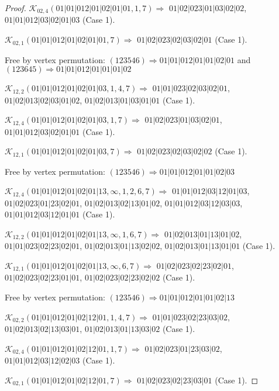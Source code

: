 \documentclass[12pt]{article}
\theoremstyle{plain}
\theoremstyle{definition}
\theoremstyle{remark}
\newcommand{\fancy}[1]{\mathcal{#1}}
\def\K{\fancy{K}}
\begin{document}
\begin{proof}
	$\K_{02,4}(01|01|012|01|02|01|01,1, 7)\Rightarrow $ $01|02|023|01|03|02|02$, $01|01|012|03|02|01|03$ (Case 1).
	
	$\K_{02,1}(01|01|012|01|02|01|01,7)\Rightarrow $ $01|02|023|02|03|02|01$ (Case 1).
	
	
	
	Free by vertex permutation: $(1 2 3 5 4 6)\Rightarrow 01|01|012|01|01|02|01$ and $(1 2 3 6 4 5)\Rightarrow 01|01|012|01|01|01|02$
	
	
	
	\bigskip
	
	$\K_{12,2}(01|01|012|01|02|01|03,1, 4, 7)\Rightarrow $ $01|01|023|02|03|02|01$, $01|02|013|02|03|01|02$, $01|02|013|01|03|01|01$ (Case 1).
	
	$\K_{12,4}(01|01|012|01|02|01|03,1, 7)\Rightarrow $ $01|02|023|01|03|02|01$, $01|01|012|03|02|01|01$ (Case 1).
	
	$\K_{12,1}(01|01|012|01|02|01|03,7)\Rightarrow $ $01|02|023|02|03|02|02$ (Case 1).
	
	
	
	Free by vertex permutation: $(1 2 3 5 4 6)\Rightarrow 01|01|012|01|01|02|03$
	
	
	
	\bigskip
	
	$\K_{12,4}(01|01|012|01|02|01|13,\infty,1, 2, 6, 7)\Rightarrow $ $01|01|012|03|12|01|03$, $01|02|023|01|23|02|01$, $01|02|013|02|13|01|02$, $01|01|012|03|12|03|03$, $01|01|012|03|12|01|01$ (Case 1).
	
	$\K_{12,2}(01|01|012|01|02|01|13,\infty,1, 6, 7)\Rightarrow $ $01|02|013|01|13|01|02$, $01|01|023|02|23|02|01$, $01|02|013|01|13|02|02$, $01|02|013|01|13|01|01$ (Case 1).
	
	$\K_{12,1}(01|01|012|01|02|01|13,\infty,6, 7)\Rightarrow $ $01|02|023|02|23|02|01$, $01|02|023|02|23|01|01$, $01|02|023|02|23|02|02$ (Case 1).
	
	
	
	Free by vertex permutation: $(1 2 3 5 4 6)\Rightarrow 01|01|012|01|01|02|13$
	
	
	
	\bigskip
	
	$\K_{02,2}(01|01|012|01|02|12|01,1, 4, 7)\Rightarrow $ $01|01|023|02|23|03|02$, $01|02|013|02|13|03|01$, $01|02|013|01|13|03|02$ (Case 1).
	
	$\K_{02,4}(01|01|012|01|02|12|01,1, 7)\Rightarrow $ $01|02|023|01|23|03|02$, $01|01|012|03|12|02|03$ (Case 1).
	
	$\K_{02,1}(01|01|012|01|02|12|01,7)\Rightarrow $ $01|02|023|02|23|03|01$ (Case 1).
	

\end{proof}
\end{document}
